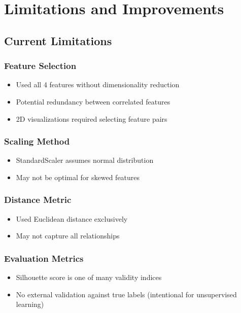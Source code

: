 \documentclass[12pt,a4paper]{article}
\begin{document}
\newpage

\section{Limitations and Improvements}

\subsection{Current Limitations}

\subsubsection{Feature Selection}
\begin{itemize}
    \item Used all 4 features without dimensionality reduction
    \item Potential redundancy between correlated features
    \item 2D visualizations required selecting feature pairs
\end{itemize}

\subsubsection{Scaling Method}
\begin{itemize}
    \item StandardScaler assumes normal distribution
    \item May not be optimal for skewed features
\end{itemize}

\subsubsection{Distance Metric}
\begin{itemize}
    \item Used Euclidean distance exclusively
    \item May not capture all relationships
\end{itemize}

\subsubsection{Evaluation Metrics}
\begin{itemize}
    \item Silhouette score is one of many validity indices
    \item No external validation against true labels (intentional for unsupervised learning)
\end{itemize}
\end{document}
